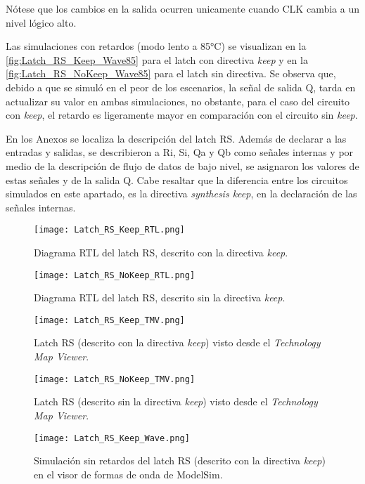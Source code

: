 Nótese que los cambios en la salida ocurren unicamente cuando CLK cambia a un nivel lógico alto.

Las simulaciones con retardos (modo lento a 85°C) se visualizan en la \autoref{fig:Latch_RS_Keep_Wave85} para el latch con directiva \textit{keep} y en la \autoref{fig:Latch_RS_NoKeep_Wave85} para el latch sin directiva. Se observa que, debido a que se simuló en el peor de los escenarios, la señal de salida Q, tarda en actualizar su valor en ambas simulaciones, no obstante, para el caso del circuito con \textit{keep}, el retardo es ligeramente mayor en comparación con el circuito sin \textit{keep}.

En los Anexos se localiza la descripción del latch RS. Además de declarar a las entradas y salidas, se describieron a Ri, Si, Qa y Qb como señales internas y por medio de la descripción de flujo de datos de bajo nivel, se asignaron los valores de estas señales y de la salida Q. Cabe resaltar que la diferencia entre los circuitos simulados en este apartado, es la directiva \textit{synthesis keep}, en la declaración de las señales internas.

\begin{figure}[ht]
	\centering
	\texttt{[image: Latch\_RS\_Keep\_RTL.png]}
	\caption{Diagrama RTL del latch RS, descrito con la directiva \textit{keep}. \label{fig:Latch_RS_Keep_RTL}}
\end{figure}

\begin{figure}[ht]
	\centering
	\texttt{[image: Latch\_RS\_NoKeep\_RTL.png]}
	\caption{Diagrama RTL del latch RS, descrito sin la directiva \textit{keep}. \label{fig:Latch_RS_NoKeep_RTL}}
\end{figure}

\begin{figure}[ht]
	\centering
	\texttt{[image: Latch\_RS\_Keep\_TMV.png]}
	\caption{Latch RS (descrito con la directiva \textit{keep}) visto desde el \textit{Technology Map Viewer}. \label{fig:Latch_RS_Keep_TMV}}
\end{figure}

\begin{figure}[ht]
	\centering
	\texttt{[image: Latch\_RS\_NoKeep\_TMV.png]}
	\caption{Latch RS (descrito sin la directiva \textit{keep}) visto desde el \textit{Technology Map Viewer}. \label{fig:Latch_RS_NoKeep_TMV}}
\end{figure}

\begin{figure}[ht]
	\centering
	\texttt{[image: Latch\_RS\_Keep\_Wave.png]}
	\caption{Simulación sin retardos del latch RS (descrito con la directiva \textit{keep}) en el visor de formas de onda de ModelSim. \label{fig:Latch_RS_Keep_Wave}}
\end{figure}

